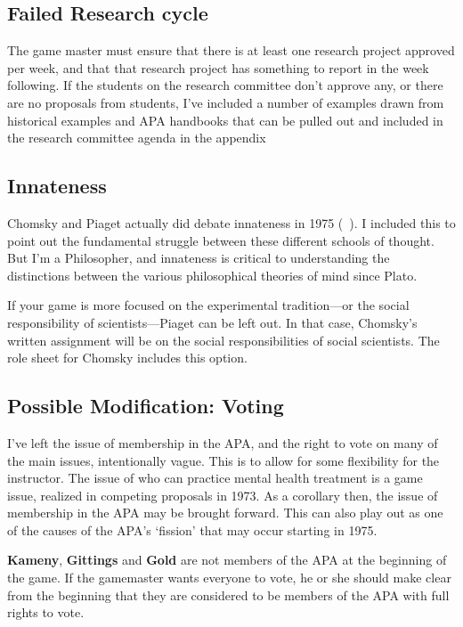 \begin{refsection}
\subsection{Failed Research cycle}
\label{failedresearchcycle}

The game master must ensure that there is at least one research project approved per week, and that that research project has something to report in the week following. If the students on the research committee don’t approve any, or there are no proposals from students, I’ve included a number of examples drawn from historical examples and APA handbooks that can be pulled out and included in the research committee agenda in the appendix 

\subsection{Innateness}
\label{innateness}

Chomsky and Piaget actually did debate innateness in 1975 (~\citep{PiatelliPalmarini:LHbFI2mG}). I included this to point out the fundamental struggle between these different schools of thought. But I’m a Philosopher, and innateness is critical to understanding the distinctions between the various philosophical theories of mind since Plato.

If your game is more focused on the experimental tradition---or the social responsibility of scientists---Piaget can be left out. In that case, Chomsky’s written assignment will be on the social responsibilities of social scientists. The role sheet for Chomsky includes this option.

\subsection{Possible Modification: Voting}
\label{possiblemodification:voting}

I've left the issue of membership in the APA, and the right to vote on many of the main issues, intentionally vague. This is to allow for some flexibility for the instructor. The issue of who can practice mental health treatment is a game issue, realized in competing proposals in 1973. As a corollary then, the issue of membership in the APA may be brought forward. This can also play out as one of the causes of the APA’s ‘fission' that may occur starting in 1975.

\textbf{Kameny}, \textbf{Gittings} and \textbf{Gold} are not members of the APA at the beginning of the game. If the gamemaster wants everyone to vote, he or she should make clear from the beginning that they are considered to be members of the APA with full rights to vote. 


\end{refsection}
